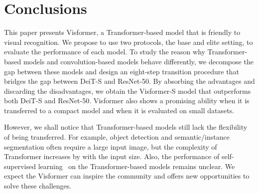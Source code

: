 \documentclass[10pt,twocolumn,letterpaper]{article}
\begin{document}
\section{Conclusions}

This paper presents Visformer, a Transformer-based model that is friendly to visual recognition. We propose to use two protocols, the base and elite setting, to evaluate the performance of each model. To study the reason why Transformer-based models and convolution-based models behave differently, we decompose the gap between these models and design an eight-step transition procedure that bridges the gap between DeiT-S and ResNet-50. By absorbing the advantages and discarding the disadvantages, we obtain the Visformer-S model that outperforms both DeiT-S and ResNet-50. Visformer also shows a promising ability when it is transferred to a compact model and when it is evaluated on small datasets.

However, we shall notice that Transformer-based models still lack the flexibility of being transferred. For example, object detection and semantic/instance segmentation often require a large input image, but the complexity of Transformer increases by  with the input size. Also, the performance of self-supervised learning~\cite{chen2020simple,he2020momentum} on the Transformer-based models remains unclear. We expect the Visformer can inspire the community and offers new opportunities to solve these challenges.

{\small


}
\end{document}
